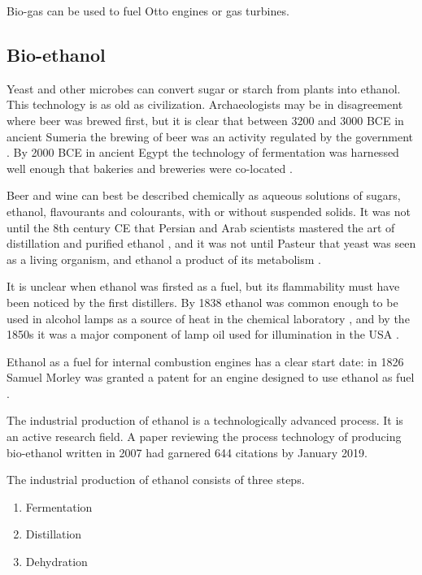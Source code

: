 Bio-gas can be used to fuel Otto engines or gas turbines. 

\subsection{Bio-ethanol}
\label{sec:BioEthanol}
Yeast and other microbes can convert sugar or starch from plants into ethanol.
This technology is as old as civilization. Archaeologists may be in disagreement
where beer was brewed first, but it is clear that between 3200 and 3000 BCE in
ancient Sumeria the brewing of beer was an activity regulated by the government
\autocite{Damerow2012}. By 2000 BCE in ancient Egypt the technology of
fermentation was harnessed well enough that bakeries and breweries were
co-located \autocite{1920}.

Beer and wine can best be described chemically as aqueous solutions of sugars,
ethanol, flavourants and colourants, with or without suspended solids. It was
not until the 8th century CE that Persian and Arab scientists mastered the art
of distillation and purified ethanol \autocite{Modanlou2008}, and it was not
until Pasteur that yeast was seen as a living organism, and ethanol a product of
its metabolism \autocite{Barnett2000}.

It is unclear when ethanol was firsted as a fuel, but its flammability must have
been noticed by the first distillers. By 1838 ethanol was common enough to be
used in alcohol lamps as a source of heat in the chemical laboratory
\autocite{Griffin1838}, and by the 1850s it was a major component of lamp oil
used for illumination in the USA \autocite{Abebe2008}.

Ethanol as a fuel for internal combustion engines has a clear start date: in 1826
Samuel Morley was granted a patent for an engine designed to use ethanol as fuel
\autocite[p. 79]{Cummins1989}.

The industrial production of ethanol is a technologically advanced process. It
is an active research field. A paper \autocite{Cardona2007} reviewing the process
technology of producing bio-ethanol written in 2007 had garnered 644 citations
by January 2019.

The industrial production of ethanol consists of three steps. 

\begin{enumerate}
  \item Fermentation
  \item Distillation
  \item Dehydration
\end{enumerate} 


